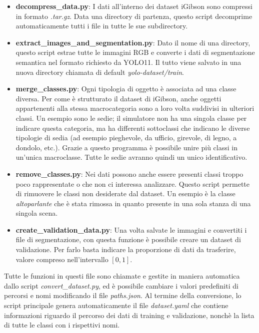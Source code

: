\documentclass[12pt]{report}
\begin{document}
\begin{itemize}
	\item \textbf{decompress\_data.py}: I dati all'interno dei dataset iGibson sono compressi in formato \textit{.tar.gz}. Data una directory di partenza, questo script decomprime automaticamente tutti i file in tutte le sue subdirectory.
	
	\item \textbf{extract\_images\_and\_segmentation.py}: Dato il nome di una directory, questo script estrae tutte le immagini RGB e converte i dati di segmentazione semantica nel formato richiesto da YOLO11. Il tutto viene salvato in una nuova directory chiamata di default \textit{yolo-dataset/train}.
	
	\item \textbf{merge\_classes.py}: Ogni tipologia di oggetto è associata ad una classe diversa. Per come è strutturato il dataset di iGibson, anche oggetti appartenenti alla stessa macrocategoria sono a loro volta suddivisi in ulteriori classi. Un esempio sono le sedie; il simulatore non ha una singola classe per indicare questa categoria, ma ha differenti sottoclassi che indicano le diverse tipologie di sedia (ad esempio pieghevole, da ufficio, girevole, di legno, a dondolo, etc.). Grazie a questo programma è possibile unire più classi in un'unica macroclasse. Tutte le sedie avranno quindi un unico identificativo.
	
	\item \textbf{remove\_classes.py}: Nei dati possono anche essere presenti classi troppo poco rappresentate o che non ci interessa analizzare. Questo script permette di rimuovere le classi non desiderate dal dataset. Un esempio è la classe \textit{altoparlante} che è stata rimossa in quanto presente in una sola stanza di una singola scena.
	
	\item \textbf{create\_validation\_data.py}: Una volta salvate le immagini e convertiti i file di segmentazione, con questa funzione è possibile creare un dataset di validazione. Per farlo basta indicare la proporzione di dati da trasferire, valore compreso nell'intervallo $[0, 1]$.
\end{itemize}

Tutte le funzioni in questi file sono chiamate e gestite in maniera automatica dallo script \textit{convert\_dataset.py}, ed è possibile cambiare i valori predefiniti di percorsi e nomi modificando il file \textit{paths.json}. Al termine della conversione, lo script principale genera automaticamente il file \textit{dataset.yaml} che contiene informazioni riguardo il percorso dei dati di training e validazione, nonchè la lista di tutte le classi con i rispettivi nomi.
\end{document}
